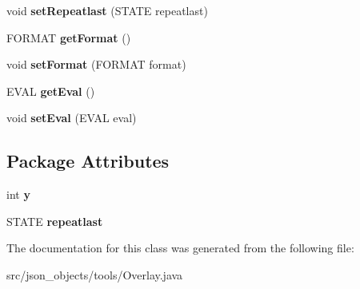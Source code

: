 \begin{DoxyCompactItemize}
\item 
\hypertarget{classjson__objects_1_1tools_1_1_overlay_ab69f7c19d513ded9d9ddd90ab9d99166}{
void {\bfseries setRepeatlast} (STATE repeatlast)}
\label{classjson__objects_1_1tools_1_1_overlay_ab69f7c19d513ded9d9ddd90ab9d99166}

\item 
\hypertarget{classjson__objects_1_1tools_1_1_overlay_a649cea97466591050202ebc1ab4cab65}{
FORMAT {\bfseries getFormat} ()}
\label{classjson__objects_1_1tools_1_1_overlay_a649cea97466591050202ebc1ab4cab65}

\item 
\hypertarget{classjson__objects_1_1tools_1_1_overlay_aac4317f5fb5e4d0a8c923e98653a6c4e}{
void {\bfseries setFormat} (FORMAT format)}
\label{classjson__objects_1_1tools_1_1_overlay_aac4317f5fb5e4d0a8c923e98653a6c4e}

\item 
\hypertarget{classjson__objects_1_1tools_1_1_overlay_a33769676bbfca4520a471abd6686b1a9}{
EVAL {\bfseries getEval} ()}
\label{classjson__objects_1_1tools_1_1_overlay_a33769676bbfca4520a471abd6686b1a9}

\item 
\hypertarget{classjson__objects_1_1tools_1_1_overlay_ab3af50f82c62fb9636d0b5299f5a0e79}{
void {\bfseries setEval} (EVAL eval)}
\label{classjson__objects_1_1tools_1_1_overlay_ab3af50f82c62fb9636d0b5299f5a0e79}

\end{DoxyCompactItemize}
\subsection*{Package Attributes}
\begin{DoxyCompactItemize}
\item 
\hypertarget{classjson__objects_1_1tools_1_1_overlay_a003f3fe9f80acb7805dcdf81ebe3462a}{
int {\bfseries y}}
\label{classjson__objects_1_1tools_1_1_overlay_a003f3fe9f80acb7805dcdf81ebe3462a}

\item 
\hypertarget{classjson__objects_1_1tools_1_1_overlay_a435e756331b1971110a0c5637a23ac71}{
STATE {\bfseries repeatlast}}
\label{classjson__objects_1_1tools_1_1_overlay_a435e756331b1971110a0c5637a23ac71}

\end{DoxyCompactItemize}


The documentation for this class was generated from the following file:\begin{DoxyCompactItemize}
\item 
src/json\_\-objects/tools/Overlay.java\end{DoxyCompactItemize}
